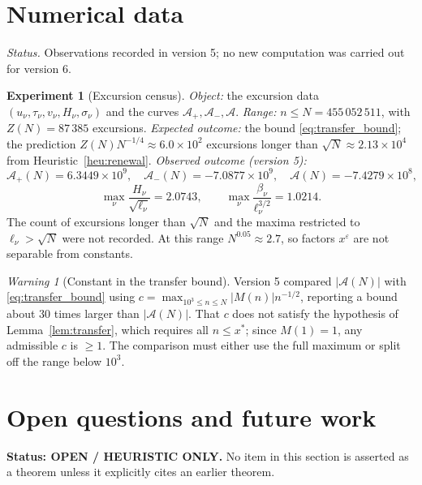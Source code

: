 \documentclass[11pt]{amsart}
\numberwithin{equation}{section}
\theoremstyle{plain}
\theoremstyle{definition}
\newtheorem{experiment}[theorem]{Experiment}
\theoremstyle{remark}
\newtheorem{warning}[theorem]{Warning}
\newcommand{\Ap}{\mathcal{A}_{+}}
\newcommand{\Am}{\mathcal{A}_{-}}
\newcommand{\Anet}{\mathcal{A}}
\newcommand{\eps}{\varepsilon}
\begin{document}
\section{Numerical data}
\label{sec:data}

\noindent\emph{Status.} Observations recorded in version 5; no new
computation was carried out for version 6.

\begin{experiment}[Excursion census]
\label{exp:census}
\emph{Object:} the excursion data $(u_\nu,\tau_\nu,v_\nu,H_\nu,\sigma_\nu)$
and the curves $\Ap,\Am,\Anet$.
\emph{Range:} $n\le N=455\,052\,511$, with $Z(N)=87\,385$ excursions.
\emph{Expected outcome:} the bound \eqref{eq:transfer_bound}; the prediction
$Z(N)N^{-1/4}\approx6.0\times10^2$ excursions longer than
$\sqrt N\approx2.13\times10^4$ from Heuristic~\ref{heu:renewal}.
\emph{Observed outcome (version 5):}
\begin{equation}
\label{eq:census_values}
  \Ap(N)=6.3449\times10^9,\quad \Am(N)=-7.0877\times10^9,\quad
  \Anet(N)=-7.4279\times10^8,
\end{equation}
\begin{equation}
\label{eq:census_max}
  \max_\nu\frac{H_\nu}{\sqrt{\ell_\nu}}=2.0743,\qquad
  \max_\nu\frac{\beta_\nu}{\ell_\nu^{3/2}}=1.0214 .
\end{equation}
The count of excursions longer than $\sqrt N$ and the maxima restricted to
$\ell_\nu>\sqrt N$ were not recorded. At this range $N^{0.05}\approx2.7$, so
factors $x^\eps$ are not separable from constants.
\end{experiment}

\begin{warning}[Constant in the transfer bound]
\label{warn:census_c}
Version 5 compared $|\Anet(N)|$ with \eqref{eq:transfer_bound} using
$c=\max_{10^3\le n\le N}|M(n)|n^{-1/2}$, reporting a bound about $30$ times
larger than $|\Anet(N)|$. That $c$ does not satisfy the hypothesis of
Lemma~\ref{lem:transfer}, which requires all $n\le x^*$; since $M(1)=1$, any
admissible $c$ is $\ge1$. The comparison must either use the full maximum or
split off the range below $10^3$.
\end{warning}

\section{Open questions and future work}
\label{sec:open_questions}

\noindent\textbf{Status: OPEN / HEURISTIC ONLY.} No item in this section
is asserted as a theorem unless it explicitly cites an earlier theorem.
\end{document}
